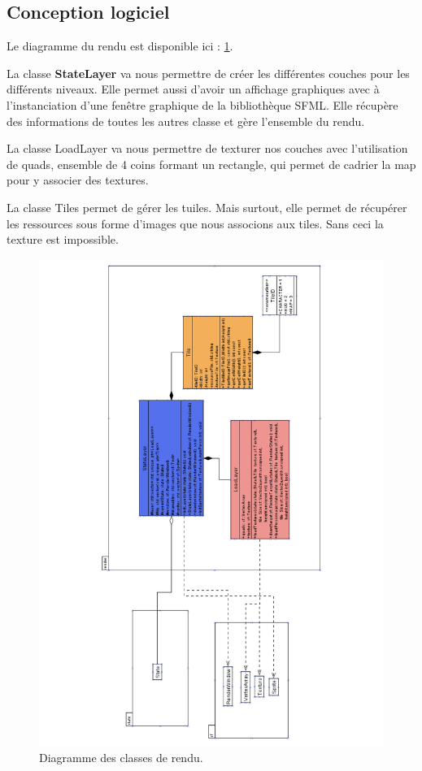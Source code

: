 \documentclass[a4paper,12pt]{article}
\begin{document}
\subsection{Conception logiciel}
Le diagramme du rendu est disponible ici : \ref{uml:render}.\\
\par
La classe \textbf{StateLayer} va nous permettre de créer les différentes couches pour les différents niveaux. Elle permet aussi d'avoir un affichage graphiques avec à l'instanciation d'une fenêtre graphique de la bibliothèque SFML. Elle récupère des informations de toutes les autres classe et gère l'ensemble du rendu.\\
\par
La classe LoadLayer va nous permettre de texturer nos couches avec l'utilisation de quads, ensemble de 4 coins formant un rectangle, qui permet de cadrier la map pour y associer des textures.\\
\par
La classe Tiles permet de gérer les tuiles. Mais surtout, elle permet de récupérer les ressources sous forme d'images que nous associons aux tiles. Sans ceci la texture est impossible.\\


\begin{landscape}
\begin{figure}[p]
\includegraphics[width=0.8\paperwidth,angle=270]{render.pdf}
\caption{\label{uml:render}Diagramme des classes de rendu.} 
\end{figure}
\end{landscape}
\end{document}
